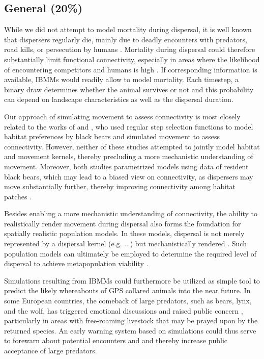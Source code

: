 \documentclass[abstract=on,10pt,a4paper,bibliography=totocnumbered]{article}
\begin{document}
\subsection{General (20\%)}
While we did not attempt to model mortality during dispersal, it is
well known that dispersers regularly die, mainly due to deadly encounters with
predators, road kills, or persecution by humans \citep{Woodroffe.2012,
Behr.2021b}. Mortality during dispersal could therefore substantially limit
functional connectivity, especially in areas where the likelihood of
encountering competitors and humans is high \citep{Cozzi.2020}. If corresponding
information is available, IBMMs would readily allow to model mortality. Each
timestep, a binary draw determines whether the animal survives or not and this
probability can depend on landscape characteristics as well as the dispersal
duration.

Our approach of simulating movement to assess connectivity is most closely
related to the works of \cite{Clark.2015} and \cite{Zeller.2020}, who used
regular step selection functions to model habitat preferences by black bears and
simulated movement to assess connectivity. However, neither of these studies
attempted to jointly model habitat and movement kernels, thereby precluding a
more mechanistic understanding of movement. Moreover, both studies parametrized
models using data of resident black bears, which may lead to a biased view on
connectivity, as dispersers may move substantially further, thereby improving
connectivity among habitat patches \citep{Elliot.2014}.

Besides enabling a more mechanistic understanding of connectivity, the ability
to realistically render movement during dispersal also forms the foundation for
spatially realistic population models. In these models, dispersal is not merely
represented by a dispersal kernel (e.g. ...) but mechanistically rendered
\citep{Revilla.2008}. Such population models can ultimately be employed to
determine the required level of dispersal to achieve metapopulation viability
\citep{DaviesMostert.2012}.

Simulations resulting from IBMMs could furthermore be utilized as simple tool to
predict the likely whereabouts of GPS collared animals into the near future. In
some European countries, the comeback of large predators, such as bears, lynx,
and the wolf, has triggered emotional discussions and raised public concern
\citep{Behr.2017}, particularly in areas with free-roaming livestock that may be
prayed upon by the returned species. An early warning system based on
simulations could thus serve to forewarn about potential encounters and and
thereby increase public acceptance of large predators.
\end{document}
